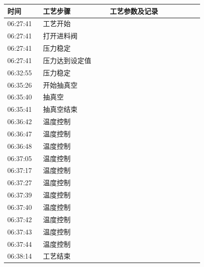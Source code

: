 \documentclass[UTF8,10pt,a4paper,fontset=fandol]{ctexart}
\newcommand{\fieldvalue}[1]{#1}
\begin{document}
\begin{center}
\small
\begin{tabular}{p{0.16\linewidth}p{0.30\linewidth}p{0.42\linewidth}}
\hline
时间 & 工艺步骤 & 工艺参数及记录 \\
\hline
\fieldvalue{06:27:41}
&
工艺开始
&
\\
\fieldvalue{06:27:41}
&
打开进料阀
&
\\
\fieldvalue{06:27:41}
&
压力稳定
&
\\
\fieldvalue{06:27:41}
&
压力达到设定值
&
\\
\fieldvalue{06:32:55}
&
压力稳定
&
\\
\fieldvalue{06:35:26}
&
开始抽真空
&
\\
\fieldvalue{06:35:40}
&
抽真空
&
\\
\fieldvalue{06:35:41}
&
抽真空结束
&
\\
\fieldvalue{06:36:42}
&
温度控制
&
\\
\fieldvalue{06:36:47}
&
温度控制
&
\\
\fieldvalue{06:36:48}
&
温度控制
&
\\
\fieldvalue{06:37:05}
&
温度控制
&
\\
\fieldvalue{06:37:17}
&
温度控制
&
\\
\fieldvalue{06:37:27}
&
温度控制
&
\\
\fieldvalue{06:37:39}
&
温度控制
&
\\
\fieldvalue{06:37:40}
&
温度控制
&
\\
\fieldvalue{06:37:42}
&
温度控制
&
\\
\fieldvalue{06:37:43}
&
温度控制
&
\\
\fieldvalue{06:37:44}
&
温度控制
&
\\
\fieldvalue{06:38:14}
&
工艺结束
&
\\
\hline
\end{tabular}
\end{center}
\end{document}
